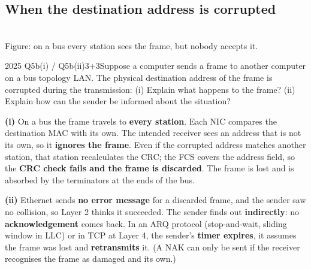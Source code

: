\documentclass[10pt]{article}
\begin{document}
\subsection{When the destination address is corrupted}
\begin{center}
\\
{\scriptsize\color{midgrey}Figure: on a bus every station sees the frame, but nobody accepts it.}
\end{center}

\begin{pastq}{2025 Q5b(i) \textnormal{/} Q5b(ii)}{3+3}Suppose a computer sends a frame to another computer on a bus topology LAN. The physical destination address of the frame is corrupted during the transmission: (i) Explain what happens to the frame? (ii) Explain how can the sender be informed about the situation?\end{pastq}
\begin{ans}
\textbf{(i)} On a bus the frame travels to \textbf{every station}. Each NIC compares the destination MAC with its own.
The intended receiver sees an address that is not its own, so it \textbf{ignores the frame}.
Even if the corrupted address matches another station, that station recalculates the CRC; the FCS covers the address field, so the \textbf{CRC check fails and the frame is discarded}.
The frame is lost and is absorbed by the terminators at the ends of the bus.

\textbf{(ii)} Ethernet sends \textbf{no error message} for a discarded frame, and the sender saw no collision, so Layer 2 thinks it succeeded.
The sender finds out \textbf{indirectly}: no \textbf{acknowledgement} comes back. In an ARQ protocol (stop-and-wait, sliding window in LLC) or in TCP at Layer 4, the sender's \textbf{timer expires}, it assumes the frame was lost and \textbf{retransmits} it. (A NAK can only be sent if the receiver recognises the frame as damaged and its own.)
\end{ans}
\end{document}
